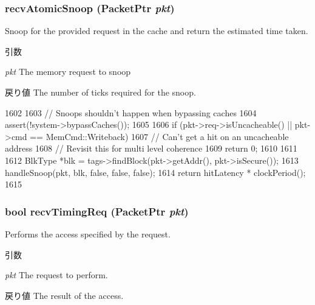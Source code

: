 \hypertarget{classCache_a886d584c81ee4e398ff8069907f6e1a5}{
\subsubsection[{recvAtomicSnoop}]{ recvAtomicSnoop ({\bf PacketPtr} {\em pkt})}}
\label{classCache_a886d584c81ee4e398ff8069907f6e1a5}
Snoop for the provided request in the cache and return the estimated time taken. 
\begin{DoxyParams}{引数}
\item[{\em pkt}]The memory request to snoop \end{DoxyParams}
\begin{DoxyReturn}{戻り値}
The number of ticks required for the snoop. 
\end{DoxyReturn}



\begin{DoxyCode}
1602 {
1603     // Snoops shouldn't happen when bypassing caches
1604     assert(!system->bypassCaches());
1605 
1606     if (pkt->req->isUncacheable() || pkt->cmd == MemCmd::Writeback) {
1607         // Can't get a hit on an uncacheable address
1608         // Revisit this for multi level coherence
1609         return 0;
1610     }
1611 
1612     BlkType *blk = tags->findBlock(pkt->getAddr(), pkt->isSecure());
1613     handleSnoop(pkt, blk, false, false, false);
1614     return hitLatency * clockPeriod();
1615 }
\end{DoxyCode}
\hypertarget{classCache_a3344d9dd0f83257feab5424e761f31c6}{
\subsubsection[{recvTimingReq}]{\setlength{\rightskip}{0pt plus 5cm}bool recvTimingReq ({\bf PacketPtr} {\em pkt})}}
\label{classCache_a3344d9dd0f83257feab5424e761f31c6}
Performs the access specified by the request. 
\begin{DoxyParams}{引数}
\item[{\em pkt}]The request to perform. \end{DoxyParams}
\begin{DoxyReturn}{戻り値}
The result of the access. 
\end{DoxyReturn}


